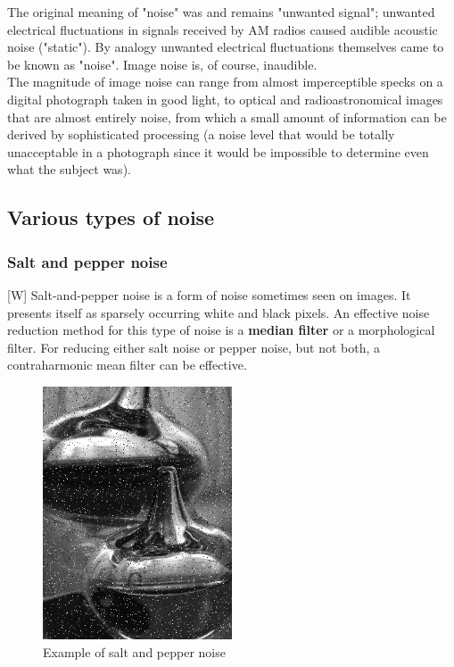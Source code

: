 \documentclass[12pt]{article}
\begin{document}
	The original meaning of "noise" was and remains "unwanted signal"; unwanted electrical
	fluctuations in signals received by AM radios caused audible acoustic noise ("static").
	By analogy unwanted electrical fluctuations themselves came to be known as "noise". 
	Image noise is, of course, inaudible.\\

	The magnitude of image noise can range from almost imperceptible specks on a digital 
	photograph taken in good light, to optical and radioastronomical images that are almost 
	entirely noise, from which a small amount of information can be derived by sophisticated 
	processing (a noise level that would be totally unacceptable in a photograph since it 
	would be impossible to determine even what the subject was).
	
	\subsection{Various types of noise}
	
	\subsubsection{Salt and pepper noise}
	[W] Salt-and-pepper noise is a form of noise sometimes seen on images. It presents itself as 
	sparsely occurring white and black pixels. An effective noise reduction method for this 
	type of noise is a \textbf{median filter} or a morphological filter. For reducing either salt 
	noise or pepper noise, but not both, a contraharmonic mean filter can be effective.
	\begin{figure}[h!]
		\centering
		\includegraphics[width=0.5\textwidth]{img/Noise_salt_and_pepper.png}
		\caption{Example of salt and pepper noise}		
		\label{fig:salt_and_pepper}
	\end{figure}
	
\end{document}
